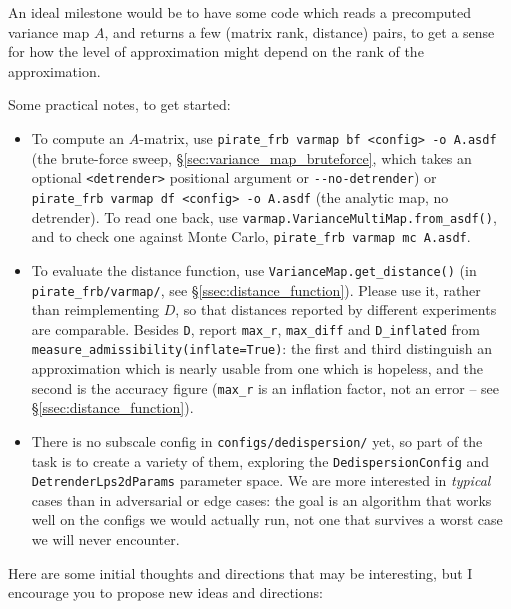 \documentclass{article}
\numberwithin{equation}{section}   %
\begin{document}
An ideal milestone would be to have some code which reads a precomputed variance map $A$,
and returns a few (matrix rank, distance) pairs, to get a sense for how the level of approximation
might depend on the rank of the approximation.

Some practical notes, to get started:
\begin{itemize}

\item To compute an $A$-matrix, use \verb|pirate_frb varmap bf <config> -o A.asdf| (the
 brute-force sweep, \S\ref{sec:variance_map_bruteforce}, which takes an optional
 \verb|<detrender>| positional argument or \verb|--no-detrender|) or
 \verb|pirate_frb varmap df <config> -o A.asdf| (the analytic map, no detrender). To read one
 back, use \verb|varmap.VarianceMultiMap.from_asdf()|, and to check one against Monte Carlo,
 \verb|pirate_frb varmap mc A.asdf|.

\item To evaluate the distance function, use \verb|VarianceMap.get_distance()| (in
 \verb|pirate_frb/varmap/|, see \S\ref{ssec:distance_function}). Please use it, rather than
 reimplementing $D$, so that distances reported by different experiments are comparable.
 Besides \verb|D|, report \verb|max_r|, \verb|max_diff| and \verb|D_inflated| from
 \verb|measure_admissibility(inflate=True)|: the first and third distinguish an approximation
 which is nearly usable from one which is hopeless, and the second is the accuracy figure
 (\verb|max_r| is an inflation factor, not an error -- see \S\ref{ssec:distance_function}).

\item There is no subscale config in \verb|configs/dedispersion/| yet, so part of the task is to
 create a variety of them, exploring the {\tt DedispersionConfig} and {\tt DetrenderLps2dParams}
 parameter space. We are more interested in {\em typical} cases than in adversarial or edge
 cases: the goal is an algorithm that works well on the configs we would actually run, not one
 that survives a worst case we will never encounter.

\end{itemize}

Here are some initial thoughts and directions that may be interesting, but
I encourage you to propose new ideas and directions:
\end{document}
